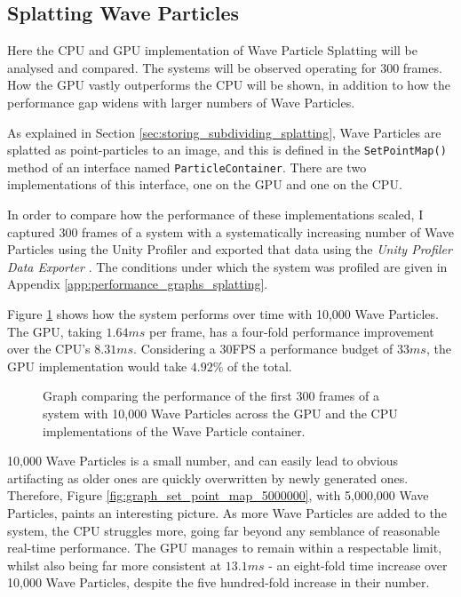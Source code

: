 \documentclass[12pt,a4paper,twoside]{report}
\begin{document}
\subsection{Splatting Wave Particles}

Here the CPU and GPU implementation of Wave Particle Splatting will
be analysed and compared. The systems will be observed operating for 300
frames. How the GPU vastly outperforms the CPU will be shown, in addition to
how the performance gap widens with larger numbers of Wave Particles.

As explained in Section \ref{sec:storing_subdividing_splatting}, Wave Particles
are splatted as point-particles to an image, and this is defined in the
\texttt{SetPointMap()} method of an interface named \texttt{ParticleContainer}.
There are two implementations of this interface, one on the GPU and one on the
CPU.

In order to compare how the performance of these implementations scaled, I
captured 300 frames of a system with a systematically increasing number of Wave
Particles using the Unity Profiler and exported that data using the
\textit{Unity Profiler Data Exporter} \cite{UnityProfilerDataExporter}. The
conditions under which the system was profiled are given in Appendix
\ref{app:performance_graphs_splatting}.

Figure \ref{fig:graph_set_point_map_10000} shows how the system performs over
time with 10,000 Wave Particles. The GPU, taking $1.64ms$ per frame, has a
four-fold performance improvement over the CPU's $8.31ms$. Considering a 30FPS
a performance budget of $33ms$, the GPU implementation would take $4.92\%$ of
the total.

\begin{figure}[h]
\centering

\caption{Graph comparing the performance of the first 300 frames of a system
with 10,000 Wave Particles across the GPU and the CPU implementations of the
Wave Particle container.}
\label{fig:graph_set_point_map_10000}
\end{figure}

10,000 Wave Particles is a small number, and can easily lead to obvious
artifacting as older ones are quickly overwritten by newly generated ones.
Therefore, Figure \ref{fig:graph_set_point_map_5000000}, with 5,000,000 Wave
Particles, paints an interesting picture. As more Wave Particles are added to
the system, the CPU struggles more, going far beyond any semblance of
reasonable real-time performance. The GPU manages to remain within a
respectable limit, whilst also being far more consistent at $13.1ms$ - an
eight-fold time increase over 10,000 Wave Particles, despite the five
hundred-fold increase in their number.
\end{document}
